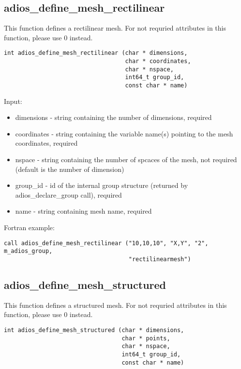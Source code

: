 \subsection{adios\_define\_mesh\_rectilinear}
This function defines a rectilinear mesh. For not requried attributes in this function, please use 0 instead.

\begin{lstlisting}[alsolanguage=Fortran,caption={},label={}]
int adios_define_mesh_rectilinear (char * dimensions,
                                   char * coordinates,
                                   char * nspace,
                                   int64_t group_id,
                                   const char * name)
\end{lstlisting}

Input:
\begin{itemize}
\item dimensions - string containing the number of dimensions, required
\item coordinates - string containing the variable name(s) pointing to the mesh coordinates, required
\item nspace - string containing the number of spcaces of the mesh, not required (default is the number of dimension)
\item group\_id - id of the internal group structure (returned by adios\_declare\_group call), required
\item name - string containing mesh name, required
\end{itemize}

Fortran example:
\begin{lstlisting}[alsolanguage=Fortran,caption={},label={}]
call adios_define_mesh_rectilinear ("10,10,10", "X,Y", "2", m_adios_group, 
                                    "rectilinearmesh")
\end{lstlisting}


\subsection{adios\_define\_mesh\_structured}
This function defines a structured mesh. For not requried attributes in this function, please use 0 instead.

\begin{lstlisting}[alsolanguage=Fortran,caption={},label={}]
int adios_define_mesh_structured (char * dimensions,
                                  char * points,
                                  char * nspace,
                                  int64_t group_id,
                                  const char * name)
\end{lstlisting}

